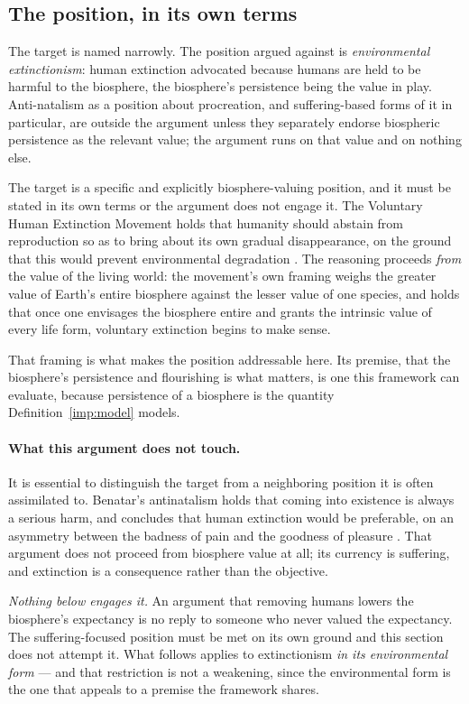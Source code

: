 \documentclass[11pt]{article}
\theoremstyle{plain}
\theoremstyle{definition}
\theoremstyle{remark}
\begin{document}
\subsection{The position, in its own terms}

The target is named narrowly. The position argued against is
\emph{environmental extinctionism}: human extinction advocated because
humans are held to be harmful to the biosphere, the biosphere's
persistence being the value in play. Anti-natalism as a position about
procreation, and suffering-based forms of it in particular, are outside
the argument unless they separately endorse biospheric persistence as
the relevant value; the argument runs on that value and on nothing
else.\label{hr:subsub:position}

The target is a specific and explicitly biosphere-valuing position, and
it must be stated in its own terms or the argument does not engage it.
The Voluntary Human Extinction Movement holds that humanity should
abstain from reproduction so as to bring about its own gradual
disappearance, on the ground that this would prevent environmental
degradation \cite{VHEMT}. The reasoning proceeds \emph{from} the value
of the living world: the movement's own framing weighs the greater value
of Earth's entire biosphere against the lesser value of one species, and
holds that once one envisages the biosphere entire and grants the
intrinsic value of every life form, voluntary extinction begins to make
sense.

That framing is what makes the position addressable here. Its premise, that the biosphere's persistence and flourishing is what matters, is one this framework can evaluate, because persistence of a biosphere
is the quantity Definition~\ref{imp:model} models.

\paragraph{What this argument does not touch.}\label{hr:rem:scope}
It is essential to distinguish the target from a neighboring position
it is often assimilated to. Benatar's antinatalism holds that coming
into existence is always a serious harm, and concludes that human
extinction would be preferable, on an asymmetry between the badness of
pain and the goodness of pleasure \cite{Benatar06}. That argument does
not proceed from biosphere value at all; its currency is suffering, and
extinction is a consequence rather than the objective.

\emph{Nothing below engages it.} An argument that removing humans lowers
the biosphere's expectancy is no reply to someone who never valued the
expectancy. The suffering-focused position must be met on its own ground
and this section does not attempt it. What follows applies to
extinctionism \emph{in its environmental form} --- and that restriction
is not a weakening, since the environmental form is the one that appeals
to a premise the framework shares.
\end{document}
